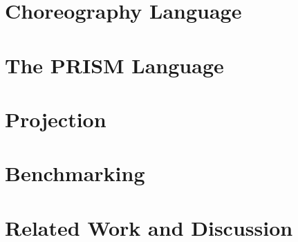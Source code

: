 \documentclass{lmcs}
\begin{document}
\section{Choreography Language}\label{sec:chor}


\section{The PRISM Language}\label{sec:prism}


\section{Projection}\label{sec:proj}


\section{Benchmarking}\label{sec:bench}


\section{Related Work and Discussion}\label{sec:relwork}





\end{document}
